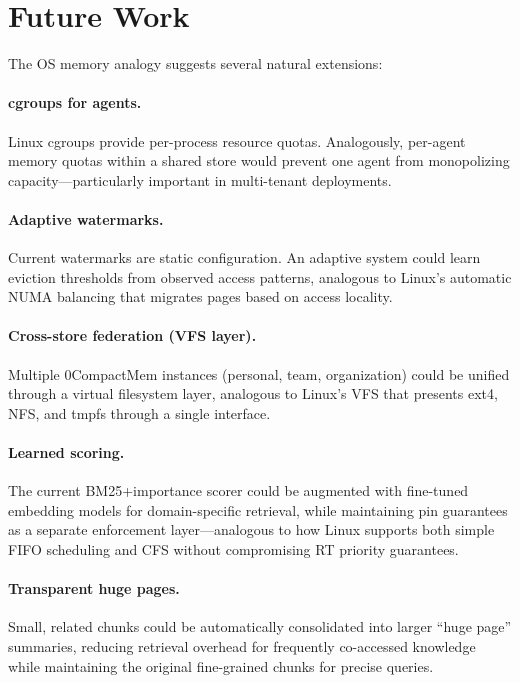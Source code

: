\documentclass[10pt,twocolumn]{article}
\begin{document}
\section{Future Work}
\label{sec:future}

The OS memory analogy suggests several natural extensions:

\paragraph{cgroups for agents.} Linux cgroups provide per-process resource quotas. Analogously, per-agent memory quotas within a shared store would prevent one agent from monopolizing capacity---particularly important in multi-tenant deployments.

\paragraph{Adaptive watermarks.} Current watermarks are static configuration. An adaptive system could learn eviction thresholds from observed access patterns, analogous to Linux's automatic NUMA balancing that migrates pages based on access locality.

\paragraph{Cross-store federation (VFS layer).} Multiple 0CompactMem instances (personal, team, organization) could be unified through a virtual filesystem layer, analogous to Linux's VFS that presents ext4, NFS, and tmpfs through a single interface.

\paragraph{Learned scoring.} The current BM25+importance scorer could be augmented with fine-tuned embedding models for domain-specific retrieval, while maintaining pin guarantees as a separate enforcement layer---analogous to how Linux supports both simple FIFO scheduling and CFS without compromising RT priority guarantees.

\paragraph{Transparent huge pages.} Small, related chunks could be automatically consolidated into larger ``huge page'' summaries, reducing retrieval overhead for frequently co-accessed knowledge while maintaining the original fine-grained chunks for precise queries.
\end{document}
